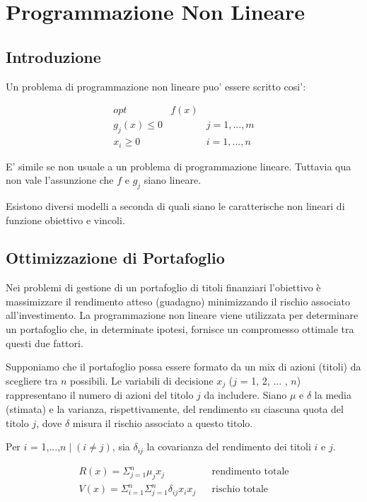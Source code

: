 \chapter{Programmazione Non Lineare}

\section{Introduzione}

Un problema di programmazione non lineare puo' essere scritto cosi':

\begin{align*}
    opt & f(x) \\
    g_j(x) \leq 0 && j = 1,...,m \\
    x_i \geq 0 && i = 1,...,n
\end{align*}

E' simile se non usuale a un problema di programmazione lineare. Tuttavia qua non vale l'assunzione che $f$ e $g_j$ siano lineare.

Esistono diversi modelli a seconda di quali siano le caratterische non lineari di funzione obiettivo e vincoli.

\section{Ottimizzazione di Portafoglio}

Nei problemi di gestione di un portafoglio di titoli finanziari l’obiettivo è massimizzare il rendimento atteso (guadagno) minimizzando il rischio associato all’investimento. La programmazione non lineare viene utilizzata per determinare un portafoglio che, in determinate ipotesi, fornisce un compromesso ottimale tra questi due fattori.

Supponiamo che il portafoglio possa essere formato da un mix di azioni (titoli) da scegliere tra $n$ possibili.
Le variabili di decisione $x_j$ ($j$ = 1, 2, ... , $n$) rappresentano il numero di azioni del titolo $j$ da includere.
Siano $\mu$ e $\delta$ la media (stimata) e la varianza, rispettivamente, del rendimento su ciascuna quota del titolo $j$, dove $\delta$ misura il rischio associato a questo titolo.

Per $i$ = 1,...,$n \mid (i \ne j)$, sia $\delta_{ij}$ la covarianza del rendimento dei titoli $i$ e $j$.

\begin{align*}
    R(x) = \Sigma ^ n _ {j=1} \mu _ j x _ j && \text{rendimento totale} \\
    V(x) = \Sigma ^ n _ {i=1} \Sigma ^ n _ {j=1} \delta _ {ij} x _ i x _ j && \text{rischio totale}
\end{align*}

